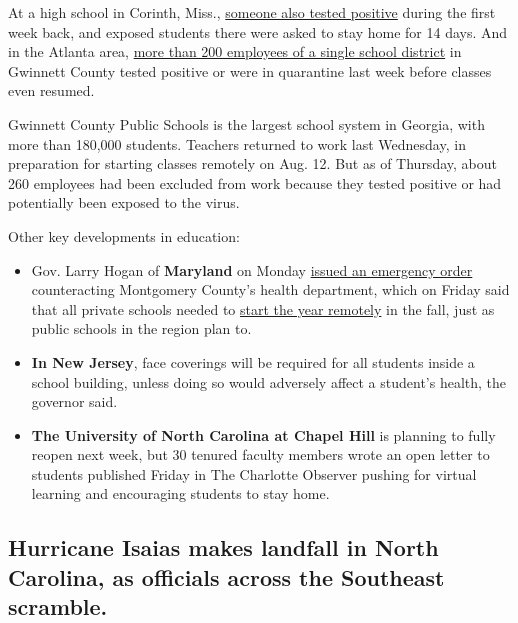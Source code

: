 At a high school in Corinth, Miss.,
\href{https://www.facebookcorewwwi.onion/corinthschooldistrict/?tn-str=k*F}{someone
also tested positive} during the first week back, and exposed students
there were asked to stay home for 14 days. And in the Atlanta area,
\href{https://www.ajc.com/news/atlanta-news/covid-cases-exposure-have-260-gwinnett-school-employees-not-working/RVZP4UFBPFHDNJJ73MNUFIKEPY/}{more
than 200 employees of a single school district} in Gwinnett County
tested positive or were in quarantine last week before classes even
resumed.

Gwinnett County Public Schools is the largest school system in Georgia,
with more than 180,000 students. Teachers returned to work last
Wednesday, in preparation for starting classes remotely on Aug. 12. But
as of Thursday, about 260 employees had been excluded from work because
they tested positive or had potentially been exposed to the virus.

Other key developments in education:

\begin{itemize}
\item
  Gov. Larry Hogan of \textbf{Maryland} on Monday
  \href{https://twitter.com/GovLarryHogan/status/1290330304830246912}{issued
  an emergency order} counteracting Montgomery County's health
  department, which on Friday said that all private schools needed to
  \href{https://www.washingtonpost.com/local/education/montgomery-county-health-officials-tell-private-schools-to-start-school-online/2020/08/01/64552b9e-d3fd-11ea-9038-af089b63ac21_story.html}{start
  the year remotely} in the fall, just as public schools in the region
  plan to.
\item
  \textbf{In New Jersey}, face coverings will be required for all
  students inside a school building, unless doing so would adversely
  affect a student's health, the governor said.
\item
  \textbf{The University of North Carolina at Chapel Hill} is planning
  to fully reopen next week, but 30 tenured faculty members wrote an
  open letter to students published Friday in The Charlotte Observer
  pushing for virtual learning and encouraging students to stay home.
\end{itemize}

\hypertarget{hurricane-isaias-makes-landfall-in-north-carolina-as-officials-across-the-southeast-scramble}{%
\subsection{Hurricane Isaias makes landfall in North Carolina, as
officials across the Southeast
scramble.}\label{hurricane-isaias-makes-landfall-in-north-carolina-as-officials-across-the-southeast-scramble}}

